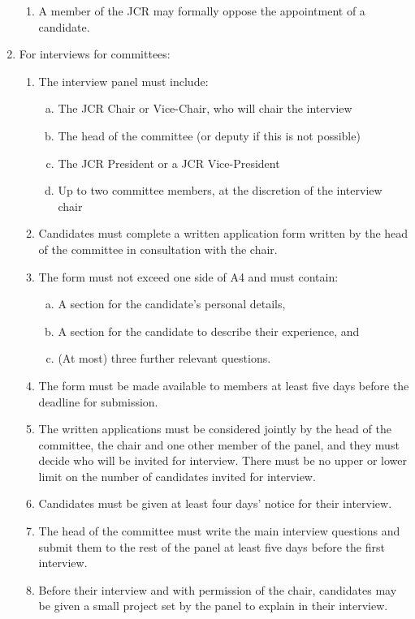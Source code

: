 \documentclass[12pt]{article}  %
\begin{document}
\begin{enumerate}
\begin{enumerate}
        \item A member of the JCR may formally oppose the appointment of a candidate.
    \end{enumerate}
    \item For interviews for committees:
    \begin{enumerate}
        \item The interview panel must include:
        \begin{enumerate}[(a)]
            \item The JCR Chair or Vice-Chair, who will chair the interview
            \item The head of the committee (or deputy if this is not possible)
            \item The JCR President or a JCR Vice-President
            \item  Up to two committee members, at the discretion of the interview chair
        \end{enumerate}
        \item Candidates must complete a written application form written by the head of the committee in consultation with the chair.
        \item The form must not exceed one side of A4 and must contain:
        \begin{enumerate}[(a)]
            \item A section for the candidate’s personal details,
            \item A section for the candidate to describe their experience, and
            \item (At most) three further relevant questions.
        \end{enumerate}
        \item The form must be made available to members at least five days before the deadline for submission.
        \item The written applications must be considered jointly by the head of the committee, the chair and one other member of the panel, and they must decide who will be invited for interview. There must be no upper or lower limit on the number of candidates invited for interview.
        \item Candidates must be given at least four days’ notice for their interview.
        \item The head of the committee must write the main interview questions and submit them to the rest of the panel at least five days before the first interview. 
        \item Before their interview and with permission of the chair, candidates may be given a small project set by the panel to explain in their interview.

\end{enumerate}
\end{enumerate}
\end{document}
